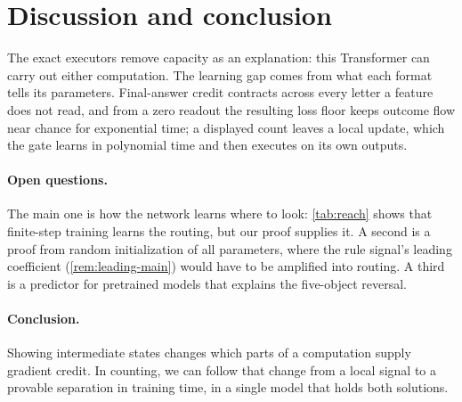 \section{Discussion and conclusion}
\label{sec:conclusion}
\label{sec:discussion}

The exact executors remove capacity as an explanation: this Transformer can carry out either computation. The learning gap comes from
what each format tells its parameters. Final-answer credit contracts across every letter a feature does not read, and from a zero readout
the resulting loss floor keeps outcome flow near chance for exponential time; a displayed count leaves a local update, which the gate
learns in polynomial time and then executes on its own outputs.

\paragraph{Open questions.} The main one is how the network learns where to look: \cref{tab:reach} shows that finite-step training learns
the routing, but our proof supplies it. A second is a proof from random initialization of all parameters, where the rule signal's
leading coefficient (\cref{rem:leading-main}) would have to be amplified into routing. A third is a predictor for pretrained models that
explains the five-object reversal.

\paragraph{Conclusion.} Showing intermediate states changes which parts of a computation supply gradient credit. In counting, we can follow
that change from a local signal to a provable separation in training time, in a single model that holds both solutions.
